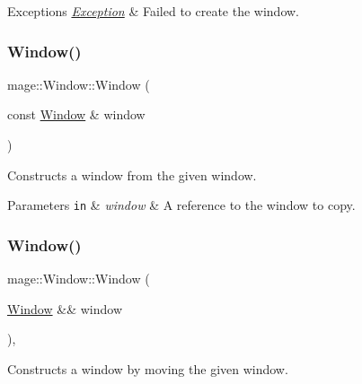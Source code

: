 \begin{DoxyExceptions}{Exceptions}
{\em \mbox{\hyperlink{classmage_1_1_exception}{Exception}}} & Failed to create the window. \\
\hline
\end{DoxyExceptions}
\mbox{\label{classmage_1_1_window_a910a63ff907559e693cb9abd3539523e}} 
\subsubsection{\texorpdfstring{Window()}{Window()}\hspace{0.1cm}{\footnotesize\ttfamily [2/3]}}
{\footnotesize\ttfamily mage\+::\+Window\+::\+Window (\begin{DoxyParamCaption}\item[{const \mbox{\hyperlink{classmage_1_1_window}{Window}} \&}]{window }\end{DoxyParamCaption})\hspace{0.3cm}{\ttfamily [delete]}}

Constructs a window from the given window.


\begin{DoxyParams}[1]{Parameters}
\mbox{\tt in}  & {\em window} & A reference to the window to copy. \\
\hline
\end{DoxyParams}
\mbox{\label{classmage_1_1_window_a32878487dd2e2f46eaaf97aaf220ee33}} 
\subsubsection{\texorpdfstring{Window()}{Window()}\hspace{0.1cm}{\footnotesize\ttfamily [3/3]}}
{\footnotesize\ttfamily mage\+::\+Window\+::\+Window (\begin{DoxyParamCaption}\item[{\mbox{\hyperlink{classmage_1_1_window}{Window}} \&\&}]{window }\end{DoxyParamCaption})\hspace{0.3cm}{\ttfamily [default]}, {\ttfamily [noexcept]}}

Constructs a window by moving the given window.


